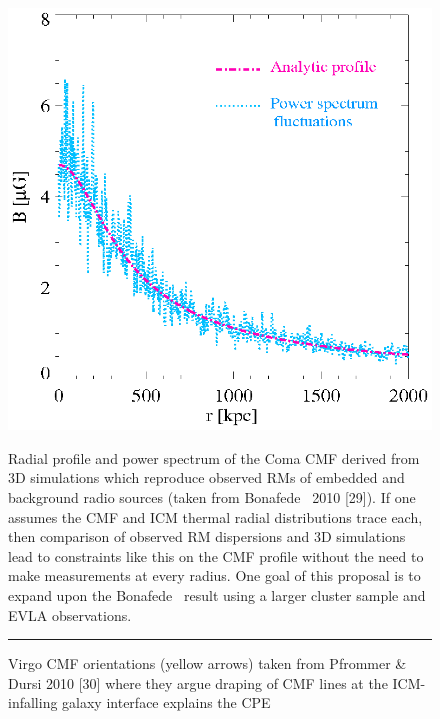 \begin{figure}
  \begin{center}
    \begin{minipage}{0.495\linewidth}
      \includegraphics*[width=\linewidth, trim=0mm 0mm 0mm 0mm, clip]{bonafede.ps}
    \end{minipage}
    \begin{minipage}{0.495\linewidth}
      \caption{Radial profile and power spectrum of the Coma CMF
        derived from 3D simulations which reproduce observed RMs of
        embedded and background radio sources (taken from Bonafede
        \etal\ 2010 [29]). If one assumes the CMF and ICM thermal
        radial distributions trace each, then comparison of observed
        RM dispersions and 3D simulations lead to constraints like
        this on the CMF profile without the need to make measurements
        at every radius. One goal of this proposal is to expand upon
        the Bonafede \etal\ result using a larger cluster sample and
        EVLA observations.}
    \end{minipage}
    \rule{\linewidth}{1pt}
    \begin{minipage}{0.495\linewidth}
      \caption{Virgo CMF orientations (yellow arrows) taken from
        Pfrommer \& Dursi 2010 [30] where they argue draping of CMF
        lines at the ICM-infalling galaxy interface explains the CPE
}
\end{minipage}
\end{center}
\end{figure}

